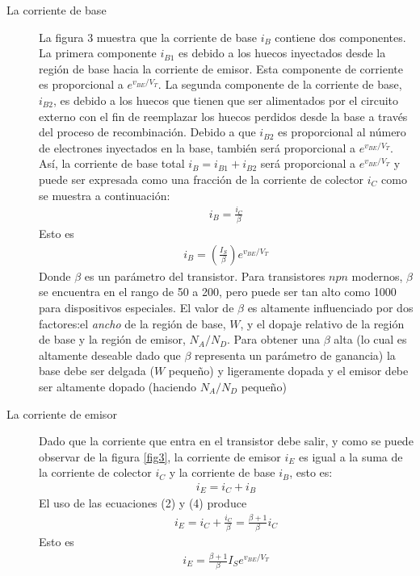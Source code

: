 \documentclass{article}
\begin{document}
\begin{description}
	\item[La corriente de base] La figura 3 muestra que la corriente de base $i_B$ contiene dos componentes. La primera componente $i_{B1}$ es debido a los huecos inyectados desde la región de base hacia la corriente de emisor. Esta componente de corriente es proporcional a $e^{v_{BE}/V_T}$. La segunda componente de la corriente de base, $i_{B2}$, es debido a los huecos que tienen que ser alimentados por el circuito externo con el fin de reemplazar los huecos perdidos desde la base a través del proceso de recombinación. Debido a que $i_{B2}$ es proporcional al número de electrones inyectados en la base, también será proporcional a $e^{v_{BE}/V_T}$. Así, la corriente de base total $i_B = i_{B1} + i_{B2}$ será proporcional a $e^{v_{BE}/V_T}$ y puede ser expresada como una fracción de la corriente de colector $i_C$ como se muestra a continuación:
	\begin{align}
		i_B = \frac{i_C}{\beta}
	\end{align}
	Esto es
	\begin{align}
		i_B = \left( \frac{I_S}{\beta}\right)e^{v_{BE}/V_T}
	\end{align}
	Donde $\beta$ es un parámetro del transistor. Para transistores $npn$ modernos, $\beta$ se encuentra en el rango de 50 a 200, pero puede ser tan alto  como 1000 para dispositivos especiales. El valor de $\beta$ es altamente influenciado por dos factores:el \textit{ancho} de la región de base, $W$, y el dopaje relativo de la región de base y la región de emisor, $N_A/N_D$. Para obtener una $\beta$ alta (lo cual es altamente deseable dado que $\beta$ representa un parámetro de ganancia) la base debe ser delgada ($W$ pequeño) y ligeramente dopada y el emisor debe ser altamente dopado (haciendo $N_A/N_D$ pequeño)
	\item[La corriente de emisor] Dado que la corriente que entra en el transistor debe salir, y como se puede observar de la figura \ref{fig3}, la corriente de emisor $i_E$ es igual a la suma de la corriente de colector $i_C$ y la corriente de base $i_B$, esto es:
	\begin{align}
		i_E = i_C + i_B
	\end{align}
	El uso de las ecuaciones (2) y (4) produce
	\begin{align}
		i_E = i_C + \frac{i_C}{\beta} = \frac{\beta + 1}{\beta}i_C
	\end{align}
	Esto es
	\begin{align}
		i_E = \frac{\beta + 1}{\beta}I_Se^{v_{BE}/V_T}
	\end{align}	
\end{description}
\end{document}
